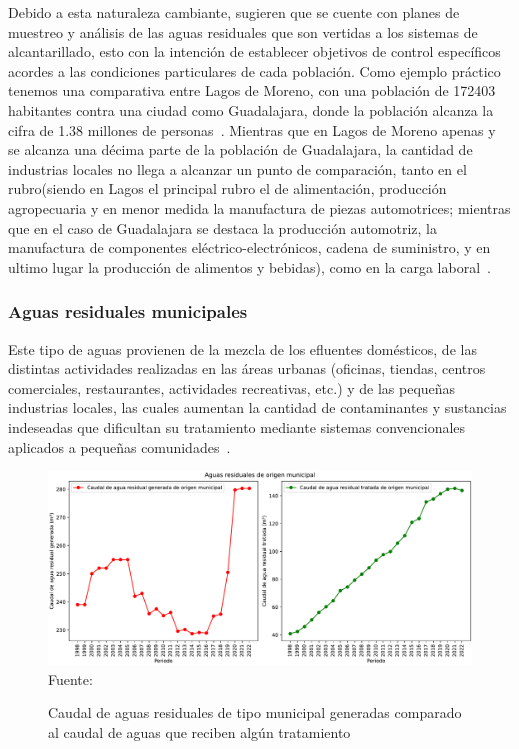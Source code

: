 Debido a esta naturaleza cambiante, \cite{Fair2008} sugieren que se cuente con planes de muestreo y análisis de las aguas residuales que son vertidas a los sistemas de alcantarillado, esto con la intención de establecer objetivos de control específicos acordes a las condiciones particulares de cada población. Como ejemplo práctico tenemos una comparativa entre Lagos de Moreno, con una población de 172403 habitantes contra una ciudad como Guadalajara, donde la población alcanza la cifra de 1.38 millones de personas~\citep{INEGIJAL}. Mientras que en Lagos de Moreno apenas y se alcanza una décima parte de la población de Guadalajara, la cantidad de industrias locales no llega a alcanzar un punto de comparación, tanto en el rubro(siendo en Lagos el principal rubro el de alimentación, producción agropecuaria y en menor medida la manufactura de piezas automotrices; mientras que en el caso de Guadalajara se destaca la producción automotriz, la manufactura de componentes eléctrico-electrónicos, cadena de suministro, y en ultimo lugar la producción de alimentos y bebidas), como en la carga laboral~\citep{Eunice2022,Lagosjal}.
\subsubsection{Aguas residuales municipales}
Este tipo de aguas provienen de la mezcla de los \glspl{efluente} domésticos, de las distintas actividades realizadas en las áreas urbanas (oficinas, tiendas, centros comerciales, restaurantes, actividades recreativas, etc.) y de las pequeñas industrias locales, las cuales aumentan la cantidad de contaminantes y sustancias indeseadas que dificultan su tratamiento mediante sistemas convencionales aplicados a pequeñas comunidades~\citep{lazcano2016}.
\begin{figure}[H]
	\centering
	\includegraphics[scale=0.45]{../Images/AR_municipal_svg-tex.pdf}
	\\\small{Fuente: \cite{INEGIJAL}}
	\caption{Caudal de aguas residuales de tipo municipal generadas comparado al caudal de aguas que reciben algún tratamiento}
\end{figure}
